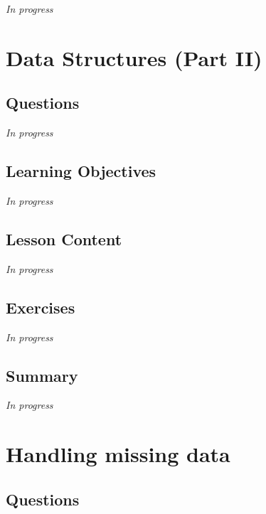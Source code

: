 \documentclass[
  letterpaper,
  DIV=11,
  numbers=noendperiod]{scrreprt}
\begin{document}
\emph{In progress}


\hypertarget{sec-data-structure-2}{%
\chapter{Data Structures (Part II)}\label{sec-data-structure-2}}

\hypertarget{questions-10}{%
\section{Questions}\label{questions-10}}

\emph{In progress}

\hypertarget{learning-objectives-10}{%
\section{Learning Objectives}\label{learning-objectives-10}}

\emph{In progress}

\hypertarget{lesson-content-10}{%
\section{Lesson Content}\label{lesson-content-10}}

\emph{In progress}

\hypertarget{exercises-10}{%
\section{Exercises}\label{exercises-10}}

\emph{In progress}

\hypertarget{summary-11}{%
\section{Summary}\label{summary-11}}

\emph{In progress}


\hypertarget{sec-missing}{%
\chapter{Handling missing data}\label{sec-missing}}

\hypertarget{questions-11}{%
\section{Questions}\label{questions-11}}
\end{document}

